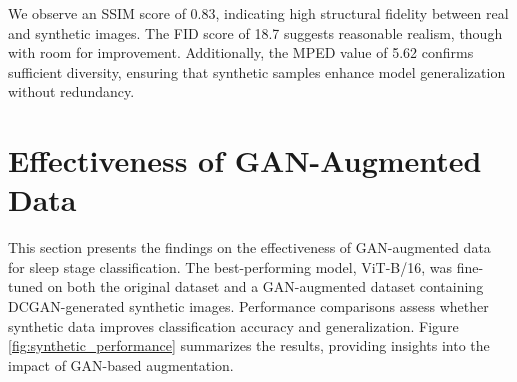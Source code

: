 \begin{table}[H]
    \centering
    \caption{DCGAN Discriminator Architecture}
    \label{tab:discriminator}
\end{table}

We observe an SSIM score of 0.83, indicating high structural fidelity between real and synthetic images. The FID score of 18.7 suggests reasonable realism, though with room for improvement. Additionally, the MPED value of 5.62 confirms sufficient diversity, ensuring that synthetic samples enhance model generalization without redundancy.

\section{Effectiveness of GAN-Augmented Data}

This section presents the findings on the effectiveness of GAN-augmented data for sleep stage classification. The best-performing model, ViT-B/16, was fine-tuned on both the original dataset and a GAN-augmented dataset containing DCGAN-generated synthetic images. Performance comparisons assess whether synthetic data improves classification accuracy and generalization. Figure \ref{fig:synthetic_performance} summarizes the results, providing insights into the impact of GAN-based augmentation.

